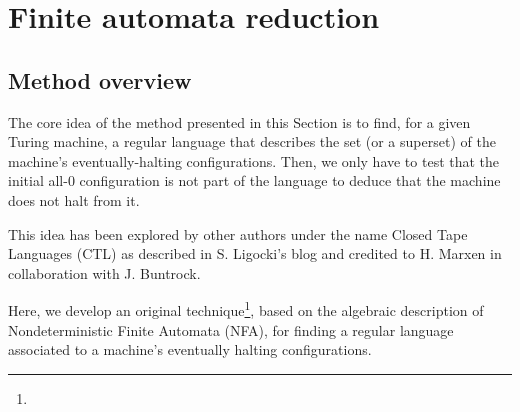 \section{Finite automata reduction}\label{sec:finite-automata-reduction}

\subsection{Method overview}

The core idea of the method presented in this Section is to find, for a given Turing machine, a regular language that describes the set (or a superset) of the machine's eventually-halting configurations. Then, we only have to test that the initial all-0 configuration is not part of the language to deduce that the machine does not halt from it.

This idea has been explored by other authors under the name Closed Tape Languages (CTL) as described in S. Ligocki's blog \cite{ShawnCTL} and credited to H. Marxen in collaboration with J. Buntrock. 


Here, we develop an original  technique\footnote{}, based on the algebraic description of Nondeterministic Finite Automata (NFA), for finding a regular language associated to a machine's eventually halting configurations.

